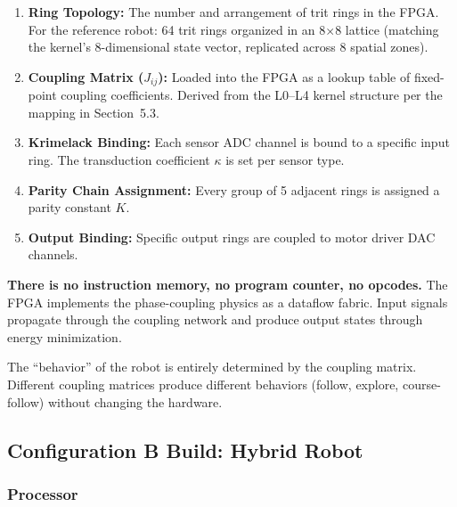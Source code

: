 \documentclass[11pt, a4paper]{article}
\begin{document}
\begin{enumerate}[label=\arabic*.]
  \item \textbf{Ring Topology:} The number and arrangement of trit rings
        in the FPGA. For the reference robot: 64 trit rings organized in
        an 8$\times$8 lattice (matching the kernel's 8-dimensional state
        vector, replicated across 8 spatial zones).
  \item \textbf{Coupling Matrix ($J_{ij}$):} Loaded into the FPGA as a
        lookup table of fixed-point coupling coefficients. Derived from
        the L0--L4 kernel structure per the mapping in Section~5.3.
  \item \textbf{Krimelack Binding:} Each sensor ADC channel is bound to
        a specific input ring. The transduction coefficient $\kappa$ is
        set per sensor type.
  \item \textbf{Parity Chain Assignment:} Every group of 5 adjacent rings
        is assigned a parity constant $K$.
  \item \textbf{Output Binding:} Specific output rings are coupled to
        motor driver DAC channels.
\end{enumerate}

\textbf{There is no instruction memory, no program counter, no opcodes.}
The FPGA implements the phase-coupling physics as a dataflow fabric. Input
signals propagate through the coupling network and produce output states
through energy minimization.

The ``behavior'' of the robot is entirely determined by the coupling
matrix. Different coupling matrices produce different behaviors (follow,
explore, course-follow) without changing the hardware.

\subsection{Configuration B Build: Hybrid Robot}

\subsubsection{Processor}
\end{document}
